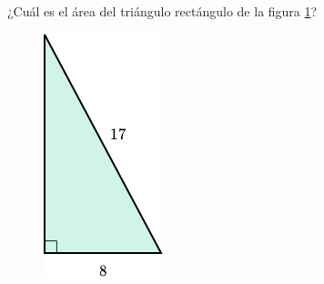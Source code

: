 ¿Cuál es el área del triángulo rectángulo de la figura \ref{fig:area_rectangulo_02}?

\begin{figure}[H]
    \begin{center}
        \includegraphics[width=0.15\linewidth]{../images/area_rectangulo_02.png}
    \end{center}
    \caption{}
    \label{fig:area_rectangulo_02}
\end{figure}
